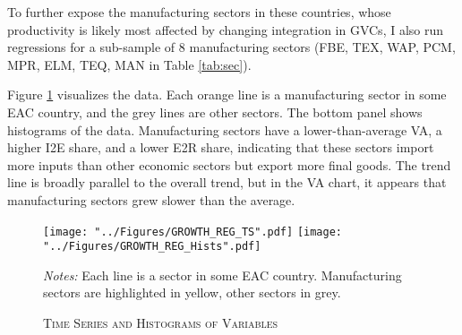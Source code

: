 \documentclass[a4paper]{article}
\begin{document}
To further expose the manufacturing sectors in these countries, whose productivity is likely most affected by changing integration in GVCs, I also run regressions for a sub-sample of 8 manufacturing sectors (FBE, TEX, WAP, PCM, MPR, ELM, TEQ, MAN in Table \ref{tab:sec}). \newline

 Figure \ref{fig:GROWTH_REG_TS} visualizes the data. Each orange line is a manufacturing sector in some EAC country, and the grey lines are other sectors. The bottom panel shows histograms of the data. Manufacturing sectors have a lower-than-average VA, a higher I2E share, and a lower E2R share, indicating that these sectors import more inputs than other economic sectors but export more final goods. The trend line is broadly parallel to the overall trend, but in the VA chart, it appears that manufacturing sectors grew slower than the average. 

\begin{figure}[h!]
\centering
\caption{\label{fig:GROWTH_REG_TS}\textsc{Time Series and Histograms of Variables}}
\texttt{[image: "../Figures/GROWTH\_REG\_TS".pdf]}
\texttt{[image: "../Figures/GROWTH\_REG\_Hists".pdf]} %
\raggedright
\scriptsize
\emph{Notes:} Each line is a sector in some EAC country. Manufacturing sectors are highlighted in yellow, other sectors in grey. 
\end{figure}
\FloatBarrier
\end{document}
